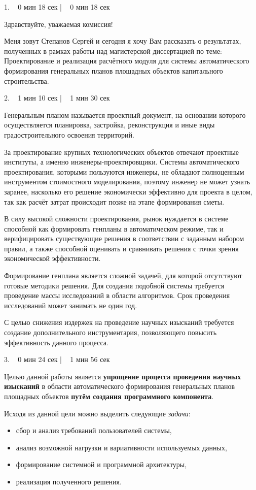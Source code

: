 \documentclass[a4paper,14pt]{extarticle}
\begin{document}
    1. ~ 0 мин 18 сек | ~ 0 мин 18 сек

    Здравствуйте, уважаемая комиссия!

    Меня зовут Степанов Сергей и сегодня я хочу Вам рассказать о результатах,
    полученных в рамках работы над магистерской диссертацией по теме:
    Проектирование и реализация расчётного модуля для системы автоматического формирования
    генеральных планов площадных объектов капитального строительства.

    2. ~ 1 мин 10 сек | ~ 1 мин 30 сек

    Генеральным планом называется
    проектный документ, на основании которого осуществляется планировка,
    застройка, реконструкция и иные виды градостроительного освоения территорий.

    За проектирование крупных технологических объектов отвечают проектные институты,
    а именно инженеры-проектировщики. Системы автоматического проектирования, которыми
    пользуются инженеры, не обладают полноценным инструментом стоимостного моделирования,
    поэтому инженер не может узнать заранее, насколько его решение экономически эффективно для проекта в целом,
    так как расчёт затрат происходит позже на этапе формирования сметы.

    В силу высокой сложности проектирования,
    рынок нуждается в системе способной как формировать генпланы в автоматическом режиме,
    так и верифицировать существующие решения в соответствии с заданным набором правил,
    а также способной оценивать и сравнивать решения с точки зрения экономической эффективности.

    Формирование генплана является сложной задачей, для которой отсутствуют готовые методики решения.
    Для создания подобной системы требуется проведение массы исследований в области алгоритмов.
    Срок проведения исследований может занимать не один год.

    С целью снижения издержек на проведение научных изысканий требуется создание дополнительного инструментария,
    позволяющего повысить эффективность данного процесса.

    3. ~ 0 мин 24 сек | ~ 1 мин 56 сек

    Целью данной работы является
    \textbf{упрощение процесса проведения научных изысканий}
    в области автоматического формирования генеральных планов площадных объектов
    \textbf{путём создания программного компонента}.

    Исходя из данной цели можно выделить следующие \textit{задачи}:
    \begin{itemize}
        \item сбор и анализ требований пользователей системы,
        \item анализ возможной нагрузки и вариативности используемых данных,
        \item формирование системной и программной архитектуры,
        \item реализация полученного решения.
    \end{itemize}
\end{document}
